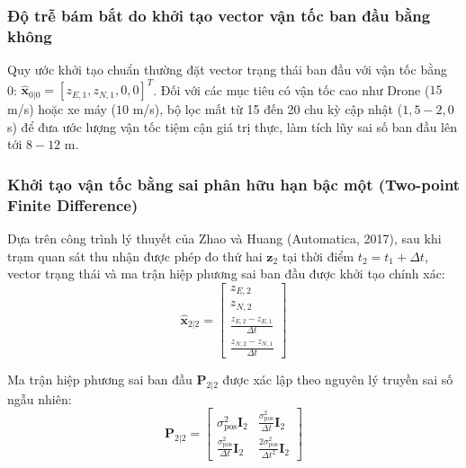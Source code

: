 \subsubsection{Độ trễ bám bắt do khởi tạo vector vận tốc ban đầu bằng không}

\hspace{0.5cm} Quy ước khởi tạo chuẩn thường đặt vector trạng thái ban đầu với vận tốc bằng 0: $\hat{\mathbf{x}}_{0|0} = [z_{E, 1}, z_{N, 1}, 0, 0]^T$. Đối với các mục tiêu có vận tốc cao như Drone ($15$ m/s) hoặc xe máy ($10$ m/s), bộ lọc mất từ 15 đến 20 chu kỳ cập nhật ($1{,}5 - 2{,}0$ s) để đưa ước lượng vận tốc tiệm cận giá trị thực, làm tích lũy sai số ban đầu lên tới $8 - 12$ m.

\subsubsection{Khởi tạo vận tốc bằng sai phân hữu hạn bậc một (Two-point Finite Difference)}

\hspace{0.5cm} Dựa trên công trình lý thuyết của Zhao và Huang (Automatica, 2017), sau khi trạm quan sát thu nhận được phép đo thứ hai $\mathbf{z}_2$ tại thời điểm $t_2 = t_1 + \Delta t$, vector trạng thái và ma trận hiệp phương sai ban đầu được khởi tạo chính xác:
\begin{equation}
\hat{\mathbf{x}}_{2|2} = \begin{bmatrix}
z_{E, 2} \\
z_{N, 2} \\
\frac{z_{E, 2} - z_{E, 1}}{\Delta t} \\
\frac{z_{N, 2} - z_{N, 1}}{\Delta t}
\end{bmatrix}
\label{eq:two-point-state-initialization}
\end{equation}

Ma trận hiệp phương sai ban đầu $\mathbf{P}_{2|2}$ được xác lập theo nguyên lý truyền sai số ngẫu nhiên:
\begin{equation}
\mathbf{P}_{2|2} = \begin{bmatrix}
\sigma_{\text{pos}}^2 \mathbf{I}_2 & \frac{\sigma_{\text{pos}}^2}{\Delta t} \mathbf{I}_2 \\
\frac{\sigma_{\text{pos}}^2}{\Delta t} \mathbf{I}_2 & \frac{2\sigma_{\text{pos}}^2}{\Delta t^2} \mathbf{I}_2
\end{bmatrix}
\label{eq:two-point-covariance-initialization}
\end{equation}

